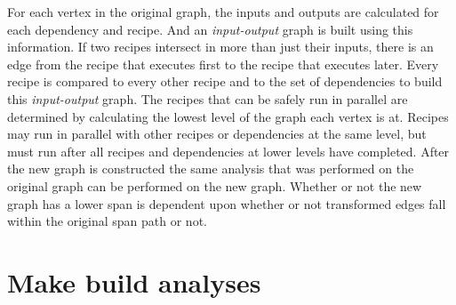\documentclass[sigconf,10pt,authorversion]{acmart}\settopmatter{printfolios=true,printccs=false,printacmref=false}
\begin{document}
For each vertex in the original graph, the inputs and outputs are calculated for each
dependency and recipe.  And an \emph{input-output} graph is built using this information.  If two
recipes intersect in more than just their inputs, there is an edge from the recipe that executes
first to the recipe that executes later.  Every recipe is compared to every other recipe and to
the set of dependencies to build this \emph{input-output} graph.  The recipes that can be safely
run in parallel are determined by calculating the lowest level of the graph each vertex is at.
Recipes may run in parallel with other recipes or dependencies at the same level, but must run
after all recipes and dependencies at lower levels have completed.  After the new graph is
constructed the same analysis that was performed on the original graph can be performed on the
new graph.  Whether or not the new graph has a lower span is dependent upon whether or not
transformed edges fall within the original span path or not.




\section{Make build analyses}
\label{sec:realanalyses}
\end{document}
